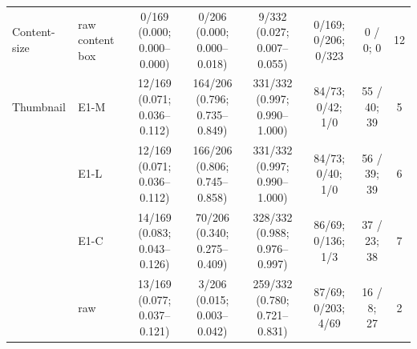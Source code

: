 \begin{tabular}{@{}llcccccc@{}}
\addlinespace[2pt]
Content-size & raw content box & \makecell{0/169\\{\scriptsize (0.000; 0.000--0.000)}} & \makecell{0/206\\{\scriptsize (0.000; 0.000--0.018)}} & \makecell{9/332\\{\scriptsize (0.027; 0.007--0.055)}} & 0/169; 0/206; 0/323 & 0 / 0; 0 & 12 \\
\addlinespace[2pt]
Thumbnail & E1-M & \makecell{12/169\\{\scriptsize (0.071; 0.036--0.112)}} & \makecell{164/206\\{\scriptsize (0.796; 0.735--0.849)}} & \makecell{331/332\\{\scriptsize (0.997; 0.990--1.000)}} & 84/73; 0/42; 1/0 & 55 / 40; 39 & 5 \\
 & E1-L & \makecell{12/169\\{\scriptsize (0.071; 0.036--0.112)}} & \makecell{166/206\\{\scriptsize (0.806; 0.745--0.858)}} & \makecell{331/332\\{\scriptsize (0.997; 0.990--1.000)}} & 84/73; 0/40; 1/0 & 56 / 39; 39 & 6 \\
 & E1-C & \makecell{14/169\\{\scriptsize (0.083; 0.043--0.126)}} & \makecell{70/206\\{\scriptsize (0.340; 0.275--0.409)}} & \makecell{328/332\\{\scriptsize (0.988; 0.976--0.997)}} & 86/69; 0/136; 1/3 & 37 / 23; 38 & 7 \\
 & raw & \makecell{13/169\\{\scriptsize (0.077; 0.037--0.121)}} & \makecell{3/206\\{\scriptsize (0.015; 0.003--0.042)}} & \makecell{259/332\\{\scriptsize (0.780; 0.721--0.831)}} & 87/69; 0/203; 4/69 & 16 / 8; 27 & 2 \\
\bottomrule
\end{tabular}
